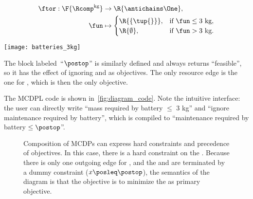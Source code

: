 \quad\quad
\begin{minipage}[c]{5cm}
    \begin{align*}
        \ftor:\F{\Rcomp^{\text{kg}}} & \rightarrow\R{\antichains\One}, \\
        \fun                         & \mapsto\begin{cases}
                                                  \R{\{\tup{ } \}}, & \text{if }\fun\leq\text{3 kg}, \\
                                                  \R{\emptyset},    & \text{if }\fun>\text{3 kg}.
                                              \end{cases}
    \end{align*}

\end{minipage}\quad\texttt{[image: batteries\_3kg]}

\smallskip{}

\noindent The block labeled~``$\postop$'' is similarly defined and always returns ``feasible'', so it has the effect of ignoring  and  as objectives.
The only resource edge is the one for , which is then the only objective.

The MCDPL code is shown in~\cref{fig:diagram_code}.
Note the intuitive interface: the user can directly write ``mass required by battery $\leq$ 3 kg'' and ``ignore maintenance required by battery'', which is compiled to ``maintenance required by battery $\leq\postop$''.

\begin{figure}
    \begin{centering}
    \end{centering}
    \begin{centering}
    \end{centering}
    \smallskip{}

    \caption{
        Composition of MCDPs can express hard constraints and precedence of objectives.
        In this case, there is a hard constraint on the .
        Because there is only one outgoing edge for , and the  and  are terminated by a dummy constraint ($x\posleq\postop$), the semantics of the diagram is that the objective is to minimize the  as primary objective.
    }
\end{figure}

